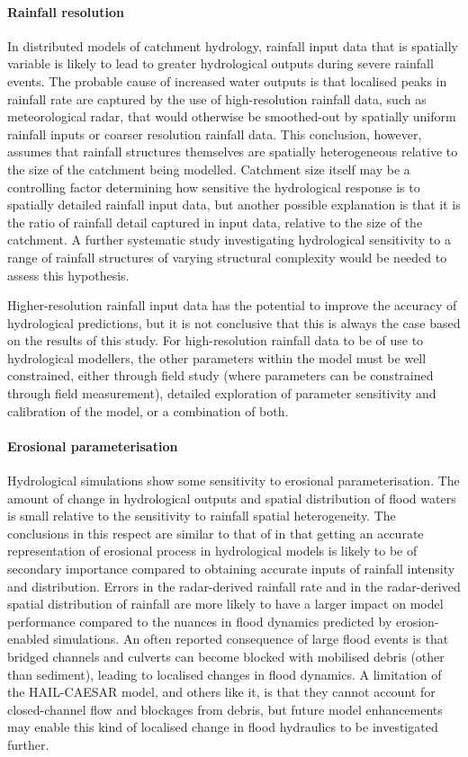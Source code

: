 \paragraph{Rainfall resolution}
In distributed models of catchment hydrology, rainfall input data that is spatially variable is likely to lead to greater hydrological outputs during severe rainfall events. The probable cause of increased water outputs is that localised peaks in rainfall rate are captured by the use of high-resolution rainfall data, such as meteorological radar, that would otherwise be smoothed-out by spatially uniform rainfall inputs or coarser resolution rainfall data. This conclusion, however, assumes that rainfall structures themselves are spatially heterogeneous relative to the size of the catchment being modelled. Catchment size itself may be a controlling factor determining how sensitive the hydrological response is to spatially detailed rainfall input data, but another possible explanation is that it is the ratio of rainfall detail captured in input data, relative to the size of the catchment. A further systematic study investigating hydrological sensitivity to a range of rainfall structures of varying structural complexity would be needed to assess this hypothesis. 

Higher-resolution rainfall input data has the potential to improve the accuracy of hydrological predictions, but it is not conclusive that this is always the case based on the results of this study. For high-resolution rainfall data to be of use to hydrological modellers, the other parameters within the model must be well constrained, either through field study (where parameters can be constrained through field measurement), detailed exploration of parameter sensitivity and calibration of the model, or a combination of both. 

\paragraph{Erosional parameterisation}
Hydrological simulations show some sensitivity to erosional parameterisation. The amount of change in hydrological outputs and spatial distribution of flood waters is small relative to the sensitivity to rainfall spatial heterogeneity. The conclusions in this respect are similar to that of \citet{wong2015sensitivity} in that getting an accurate representation of erosional process in hydrological models is likely to be of secondary importance compared to obtaining accurate inputs of rainfall intensity and distribution. Errors in the radar-derived rainfall rate and in the radar-derived spatial distribution of rainfall are more likely to have a larger impact on model performance compared to the nuances in flood dynamics predicted by erosion-enabled simulations. An often reported consequence of large flood events is that bridged channels and culverts can become blocked  with mobilised debris (other than sediment), leading to localised changes in flood dynamics. A limitation of the HAIL-CAESAR model, and others like it, is that they cannot account for closed-channel flow and blockages from debris, but future model enhancements may enable this kind of localised change in flood hydraulics to be investigated further.

